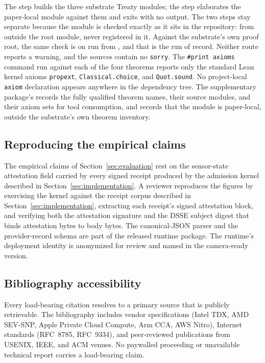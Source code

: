 The  step builds the three substrate Treaty modules;
the  step elaborates the paper-local module against
them and exits with no output. The two steps stay separate because the
module is checked exactly as it sits in the repository: from outside
the root module, never registered in it. Against the substrate's own
proof root, the same check is  on
 run from
, and that is the run of record. Neither route
reports a warning, and the sources contain no \texttt{sorry}. The
\texttt{\#print axioms} command run against each of the four theorems
reports only the standard Lean kernel axioms \texttt{propext},
\texttt{Classical.choice}, and \texttt{Quot.sound}. No project-local
\texttt{axiom} declaration appears anywhere in the dependency tree.
The supplementary package's  records the
fully qualified theorem names, their source modules, and their axiom
sets for tool consumption, and records that the module is paper-local,
outside the substrate's own theorem inventory.

\subsection{Reproducing the empirical claims}
\label{sec:open-science:empirical}

The empirical claims of Section~\ref{sec:evaluation} rest on the
sensor-state attestation field carried by every signed receipt produced
by the admission kernel described in Section~\ref{sec:implementation}.
A reviewer reproduces the figures by exercising the kernel against the
receipt corpus described in Section~\ref{sec:implementation},
extracting each receipt's signed attestation block, and verifying both
the attestation signature and the DSSE subject digest that binds
attestation bytes to body bytes. The canonical-JSON parser and the
provider-record schema are part of the released runtime package. The
runtime's deployment identity is anonymized for review and named in
the camera-ready version.

\subsection{Bibliography accessibility}
\label{sec:open-science:bib}

Every load-bearing citation resolves to a primary source that is
publicly retrievable. The bibliography includes vendor specifications
(Intel TDX, AMD SEV-SNP, Apple Private Cloud Compute, Arm CCA, AWS
Nitro), Internet standards (RFC~8785, RFC~9334), and peer-reviewed
publications from USENIX, IEEE, and ACM venues. No paywalled
proceeding or unavailable technical report carries a load-bearing
claim.
